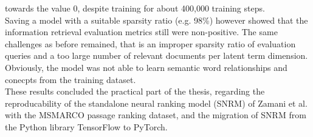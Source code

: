     towards the value 0, despite training for about 400,000 training steps.\\
Saving a model with a suitable sparsity ratio (e.g. 98\%) however showed that the information retrieval
    evaluation metrics still were non-positive.
The same challenges as before remained, that is an improper sparsity ratio of evaluation queries and 
    a too large number of relevant documents per latent term dimension.
Obviously, the model was not able to learn semantic word relationships and conecpts 
    from the training dataset.\\
These results concluded the practical part of the thesis, regarding the reproducability of the 
    standalone neural ranking model (SNRM) of
    Zamani et al. \cite{zamani:2018:from-neural-reranking-to-neural-ranking}
    with the MSMARCO passage ranking dataset, 
    and the migration of SNRM from the Python library TensorFlow to PyTorch.

